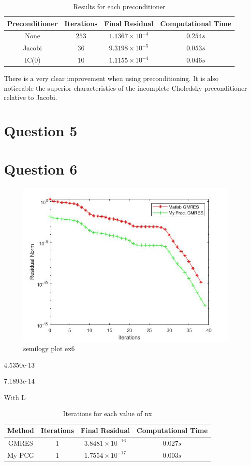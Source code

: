 \documentclass[a4paper, 11pt]{article}
\begin{document}
			\begin{table}[H]
			\centering
			\begin{tabular}{c|c|c|c}
				\textbf{Preconditioner} &  \textbf{Iterations} 	& \textbf{Final Residual} 		& \textbf{Computational Time} 	\\ \hline
				None					& 			$253$ 		& $ 1.1367 \times 10^{-4} $ 	& $ 0.254 s $	\\ \hline
				Jacobi					& 			$36$ 		& $ 9.3198 \times 10^{-5} $ 	& $ 0.053 s $	\\ \hline		
				IC(0)					& 			$10$		& $ 1.1155 \times 10^{-4} $		& $	0.046 s $	\\
			\end{tabular}
			\caption{Results for each preconditioner}
			\label{table:ex4}
			\end{table}
		
		There is a very clear improvement when using preconditioning.
		It is also noticeable the superior characteristics of the incomplete Choledsky preconditioner relative to Jacobi.
		
		\section*{Question 5}
		
		
		\section*{Question 6}
		\begin{figure}[H]
			\centering
			\includegraphics[width=.6\linewidth]{ex6.jpg}
			\caption{semilogy plot ex6}
			\label{fig:ex6}
		\end{figure}
		
		4.5350e-13
		
		7.1893e-14
		
			
		
		With L
		
		\begin{table}[H]
			\centering
			\begin{tabular}{c|c|c|c}
				\textbf{Method} &  \textbf{Iterations} 	& \textbf{Final Residual} 		& \textbf{Computational Time} 	\\ \hline
				GMRES 			& 			1 			& $ 3.8481 \times 10^{-16} $	& $ 0.027 s $	\\ \hline	
				My PCG 			& 			1			& $ 1.7554 \times 10^{-17} $	& $ 0.003 s $	\\ \hline
			\end{tabular}
			\caption{Iterations for each value of nx}
			\label{table:ex4_c_prec}
		\end{table}	
	
\end{document}
